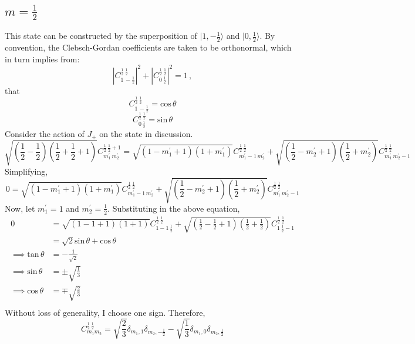 \documentclass{article}
\begin{document}
\subsection*{$m=\frac{1}{2}$}
This state can be constructed by the superposition of $|1,-\frac{1}{2}\rangle$ and $|0,\frac{1}{2}\rangle$. By convention, the Clebsch-Gordan coefficients are taken to be orthonormal, which in turn implies from:
$$|C^{\frac{1}{2} \, \frac{1}{2}}_{1 \, -\frac{1}{2}}|^{2} + |C^{\frac{1}{2} \, \frac{1}{2}}_{0 \, \frac{1}{2}}|^{2}=1 \, , $$ that
$$C^{\frac{1}{2} \, \frac{1}{2}}_{1 \, -\frac{1}{2}} = \text{cos} \, \theta$$
$$C^{\frac{1}{2} \, \frac{1}{2}}_{0 \, \frac{1}{2}} = \text{sin} \, \theta$$
Consider the action of $J_{+}$ on the state in discussion. 
$$ \sqrt{(\frac{1}{2}-\frac{1}{2})(\frac{1}{2}+\frac{1}{2}+1)} C^{\frac{1}{2} \, \frac{1}{2}+1}_{m^{\prime}_{1} \, m^{\prime}_{2}} =\sqrt{(1-m^{\prime}_{1}+1)(1+m^{\prime}_{1})} C^{\frac{1}{2} \, \frac{1}{2}}_{m^{\prime}_{1}-1 \, m^{\prime}_{2}} + \sqrt{(\frac{1}{2}-m^{\prime}_{2}+1)(\frac{1}{2}+m^{\prime}_{2})} C^{\frac{1}{2} \, \frac{1}{2}}_{m^{\prime}_{1} \, m^{\prime}_{2}-1}$$ 
Simplifying,
$$ 0 = \sqrt{(1-m^{\prime}_{1}+1)(1+m^{\prime}_{1})} C^{\frac{1}{2} \, \frac{1}{2}}_{m^{\prime}_{1}-1 \, m^{\prime}_{2}} + \sqrt{(\frac{1}{2}-m^{\prime}_{2}+1)(\frac{1}{2}+m^{\prime}_{2})} C^{\frac{1}{2} \, \frac{1}{2}}_{m^{\prime}_{1} \, m^{\prime}_{2}-1}$$
Now, let $m^{\prime}_{1}=1$ and $m^{\prime}_{2}=\frac{1}{2}$. Substituting in the above equation,
\begin{align*}
    0 & = \sqrt{(1-1+1)(1+1)} C^{\frac{1}{2} \, \frac{1}{2}}_{1-1 \, \frac{1}{2}} + \sqrt{(\frac{1}{2}-\frac{1}{2}+1)(\frac{1}{2}+\frac{1}{2})} C^{\frac{1}{2} \, \frac{1}{2}}_{1 \, \frac{1}{2}-1} \\ 
    & = \sqrt{2} \text{sin} \, \theta + \text{cos} \, \theta \\
    \implies \text{tan} \, \theta & = -\frac{1}{\sqrt{2}} \\
    \implies \text{sin} \, \theta & = \pm \sqrt{\frac{1}{3}} \\
    \implies \text{cos} \, \theta & = \mp \sqrt{\frac{2}{3}} \\
\end{align*}
Without loss of generality, I choose one sign. Therefore,
$$C^{\frac{1}{2} \, \frac{1}{2}}_{m_{1} m_{2}} = \sqrt{\frac{2}{3}} \delta_{m_{1},1}\delta_{m_{2},-\frac{1}{2}} - \sqrt{\frac{1}{3}}\delta_{m_{1},0}\delta_{m_{2},\frac{1}{2}}$$
\end{document}

